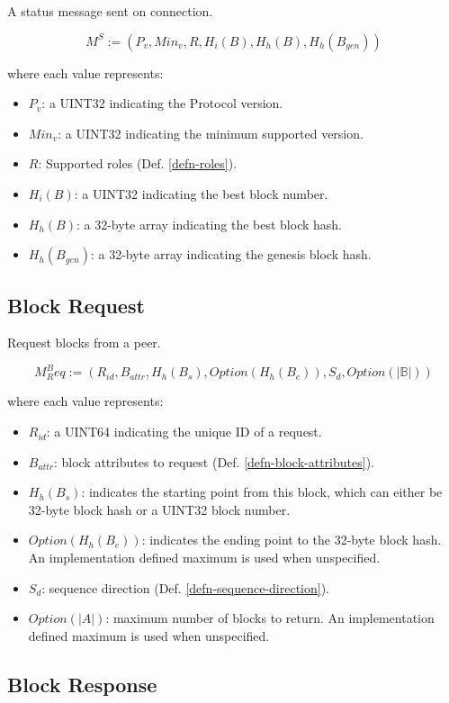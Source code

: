 \documentclass{book}
\begin{document}
A status message sent on connection.

\[
    M^S := (P_v, Min_v, R, H_i(B), H_h(B), H_h(B_{gen}))
\]

where each value represents:

\begin{itemize}
    \item $P_v$: a UINT32 indicating the Protocol version.
    \item $Min_v$: a UINT32 indicating the minimum supported version.
    \item $R$: Supported roles (Def. \ref{defn-roles}).
    \item $H_i(B)$: a UINT32 indicating the best block number.
    \item $H_h(B)$: a 32-byte array indicating the best block hash.
    \item $H_h(B_{gen})$: a 32-byte array indicating the genesis block hash.
\end{itemize}

\subsection{Block Request}\label{sect-block-request}

Request blocks from a peer.

\[
    M^B_Req := (R_{id}, B_{attr}, H_h(B_s), Option(H_h(B_e)), S_d, Option(|\mathbb{B}|))
\]

where each value represents:

\begin{itemize}
    \item $R_{id}$: a UINT64 indicating the unique ID of a request.
    \item $B_{attr}$: block attributes to request (Def.
    \ref{defn-block-attributes}).
    \item $H_h(B_s)$: indicates the starting point from this block, which can either
    be 32-byte block hash or a UINT32 block number.
    \item $Option(H_h(B_e))$: indicates the ending point to the 32-byte block
    hash. An implementation defined maximum is used when unspecified.
    \item $S_d$: sequence direction (Def. \ref{defn-sequence-direction}). 
    \item $Option(|A|)$: maximum number of blocks to return. An
    implementation defined maximum is used when unspecified.
\end{itemize}

\subsection{Block Response}
\end{document}
